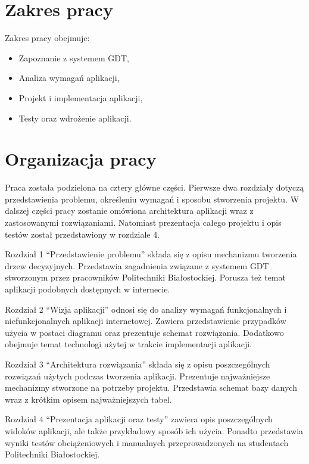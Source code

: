 \section*{Zakres pracy}
Zakres pracy obejmuje: 

\begin{itemize}
\item Zapoznanie z systemem GDT,
\item Analiza wymagań aplikacji,
\item Projekt i implementacja aplikacji, 
\item Testy oraz wdrożenie aplikacji.
\end{itemize}


\section*{Organizacja pracy}
Praca została podzielona na cztery główne części. Pierwsze dwa rozdziały dotyczą przedstawienia problemu, określeniu wymagań i sposobu stworzenia projektu. W dalszej części pracy zostanie omówiona architektura aplikacji wraz z zastosowanymi rozwiązaniami. Natomiast prezentacja całego projektu i opis testów został przedstawiony w rozdziale 4. 

Rozdział 1 \enquote{Przedstawienie problemu} składa się z opisu mechanizmu tworzenia drzew decyzyjnych. Przedstawia zagadnienia związane z systemem GDT stworzonym przez pracowników Politechniki Białostockiej. Porusza też temat aplikacji podobnych dostępnych w internecie.

Rozdział 2 \enquote{Wizja aplikacji} odnosi się do analizy wymagań funkcjonalnych i niefunkcjonalnych aplikacji internetowej. Zawiera przedstawienie przypadków użycia w postaci diagramu oraz prezentuje schemat rozwiązania. Dodatkowo obejmuje temat technologi użytej w trakcie implementacji aplikacji.

Rozdział 3 \enquote{Architektura rozwiązania} składa się z opisu poszczególnych rozwiązań użytych podczas tworzenia aplikacji. Prezentuje najważniejsze mechanizmy stworzone na potrzeby projektu. Przedstawia schemat bazy danych wraz z krótkim opisem najważniejszych tabel.

Rozdział 4 \enquote{Prezentacja aplikacji oraz testy} zawiera opis poszczególnych widoków aplikacji, ale także przykładowy sposób ich użycia. Ponadto przedstawia wyniki testów obciążeniowych i manualnych przeprowadzonych na studentach Politechniki Białostockiej.